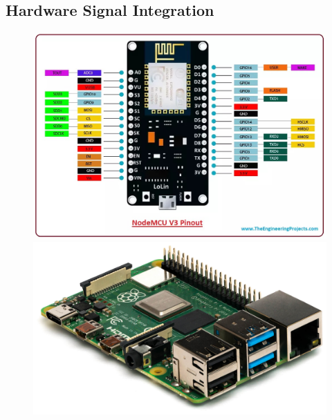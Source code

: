 \documentclass[usenatbib]{tjaa}
\begin{document}
\subsection{Hardware Signal Integration}

\begin{figure}  %
    \centering
    \begin{minipage}[b]{0.16\textwidth}
        \centering
        \includegraphics[width=\textwidth]{3.jpeg}
    \end{minipage}
    \hspace{0.01\textwidth} %
    \begin{minipage}[b]{0.16\textwidth}
        \centering
        \includegraphics[width=\textwidth]{4.jpg}
    \end{minipage}
    \hspace{0.01\textwidth}
    \begin{minipage}[b]{0.16\textwidth}

\end{minipage}
\end{figure}
\end{document}
